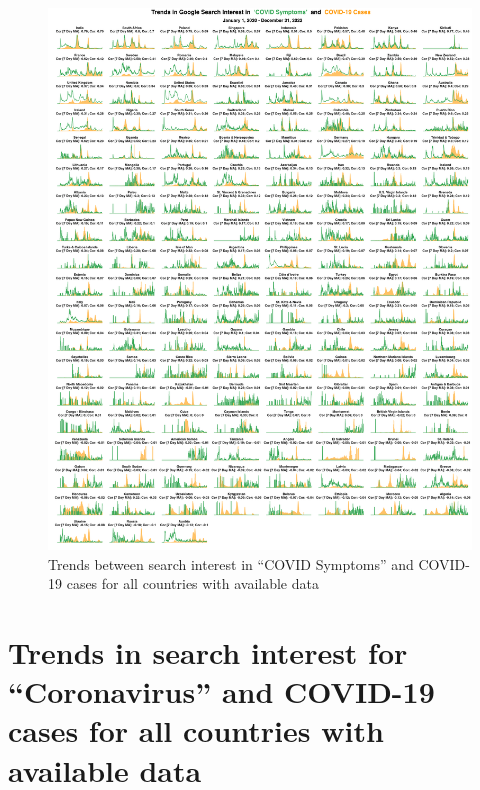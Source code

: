 \documentclass{article}
\begin{document}
\begin{figure}[H]
    \includegraphics[width=1\textwidth]{figures/cases_vs_covid_symptoms_trends_allcountries.png}
    \caption{Trends between search interest in ``COVID Symptoms'' and COVID-19 cases for all countries with available data}
    \label{fig:cases_vs_covid_symptoms_trends_allcountries}
\end{figure}

\newpage
\section{Trends in search interest for ``Coronavirus'' and COVID-19 cases for all countries with available data}
\label{si:coronavirus_covid_allcountries}
\end{document}
